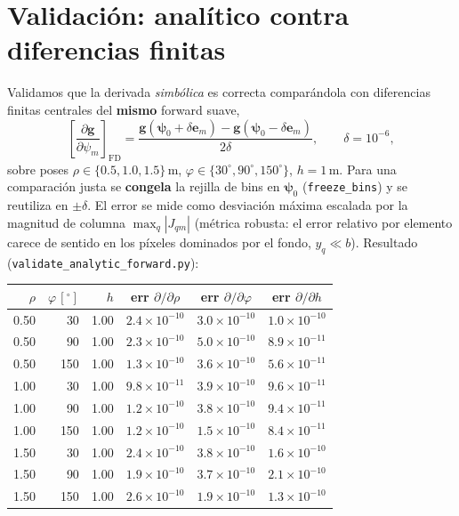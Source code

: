 \documentclass[11pt,a4paper]{article}
\theoremstyle{plain}
\theoremstyle{definition}
\newcommand{\vect}[1]{\boldsymbol{#1}}
\begin{document}
\section{Validaci\'on: anal\'itico contra diferencias finitas}
\label{sec:validacion}

Validamos que la derivada \emph{simb\'olica} es correcta compar\'andola con
diferencias finitas centrales del \textbf{mismo} forward suave,
\begin{equation}
    \left[\frac{\partial\vect{g}}{\partial\psi_m}\right]_{\mathrm{FD}}
    =\frac{\vect{g}(\vect{\psi}_0+\delta\vect{e}_m)-\vect{g}(\vect{\psi}_0-\delta\vect{e}_m)}{2\delta},
    \qquad \delta=10^{-6},
    \label{eq:fd}
\end{equation}
sobre poses $\rho\in\{0.5,1.0,1.5\}$\,m,
$\varphi\in\{30^\circ,90^\circ,150^\circ\}$, $h=1$\,m. Para una comparaci\'on
justa se \textbf{congela} la rejilla de bins en $\vect{\psi}_0$
(\texttt{freeze\_bins}) y se reutiliza en $\pm\delta$. El error se mide como
desviaci\'on m\'axima escalada por la magnitud de columna $\max_q|J_{qm}|$
(m\'etrica robusta: el error relativo por elemento carece de sentido en los
p\'ixeles dominados por el fondo, $y_q\ll b$). Resultado
(\texttt{validate\_analytic\_forward.py}):
\begin{center}
\small
\begin{tabular}{@{}rrr|ccc@{}}
\toprule
$\rho$ & $\varphi\,[^\circ]$ & $h$ & err $\partial/\partial\rho$ & err $\partial/\partial\varphi$ & err $\partial/\partial h$ \\
\midrule
0.50 &  30 & 1.00 & $2.4\times10^{-10}$ & $3.0\times10^{-10}$ & $1.0\times10^{-10}$ \\
0.50 &  90 & 1.00 & $2.3\times10^{-10}$ & $5.0\times10^{-10}$ & $8.9\times10^{-11}$ \\
0.50 & 150 & 1.00 & $1.3\times10^{-10}$ & $3.6\times10^{-10}$ & $5.6\times10^{-11}$ \\
1.00 &  30 & 1.00 & $9.8\times10^{-11}$ & $3.9\times10^{-10}$ & $9.6\times10^{-11}$ \\
1.00 &  90 & 1.00 & $1.2\times10^{-10}$ & $3.8\times10^{-10}$ & $9.4\times10^{-11}$ \\
1.00 & 150 & 1.00 & $1.2\times10^{-10}$ & $1.5\times10^{-10}$ & $8.4\times10^{-11}$ \\
1.50 &  30 & 1.00 & $2.4\times10^{-10}$ & $3.8\times10^{-10}$ & $1.6\times10^{-10}$ \\
1.50 &  90 & 1.00 & $1.9\times10^{-10}$ & $3.7\times10^{-10}$ & $2.1\times10^{-10}$ \\
1.50 & 150 & 1.00 & $2.6\times10^{-10}$ & $1.9\times10^{-10}$ & $1.3\times10^{-10}$ \\
\bottomrule
\end{tabular}
\end{center}
\end{document}
